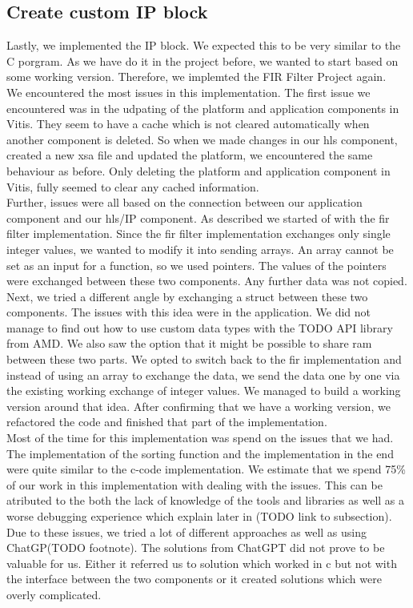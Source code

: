\documentclass[conference]{IEEEtran}
\begin{document}
\subsection{Create custom IP block}
Lastly, we implemented the IP block. We expected this to be very similar to the C porgram. As we have do it in the project before, we wanted to start based on some working version. Therefore, we implemted the FIR Filter Project again. \\
We encountered the most issues in this implementation. The first issue we encountered was in the udpating of the platform and application components in Vitis. They seem to have a cache which is not cleared automatically when another component is deleted. So when we made changes in our hls component, created a new xsa file and updated the platform, we encountered the same behaviour as before. Only deleting the platform and application component in Vitis, fully seemed to clear any cached information. \\
Further, issues were all based on the connection between our application component and our hls/IP component. As described we started of with the fir filter implementation. Since the fir filter implementation exchanges only single integer values, we wanted to modify it into sending arrays. An array cannot be set as an input for a function, so we used pointers. The values of the pointers were exchanged between these two components. Any further data was not copied. Next, we tried a different angle by exchanging a struct between these two components. The issues with this idea were in the application. We did not manage to find out how to use custom data types with the TODO API library from AMD. We also saw the option that it might be possible to share ram between these two parts. We opted to switch back to the fir implementation and instead of using an array to exchange the data, we send the data one by one via the existing working exchange of integer values. We managed to build a working version around that idea. After confirming that we have a working version, we refactored the code and finished that part of the implementation. \\
Most of the time for this implementation was spend on the issues that we had. The implementation of the sorting function and the implementation in the end were quite similar to the c-code implementation. We estimate that we spend 75\% of our work in this implementation with dealing with the issues. This can be atributed to the both the lack of knowledge of the tools and libraries as well as a worse debugging experience which explain later in (TODO link to subsection). Due to these issues, we tried a lot of different approaches as well as using ChatGP(TODO footnote). The solutions from ChatGPT did not prove to be valuable for us. Either it referred us to solution which worked in c but not with the interface between the two components or it created solutions which were overly complicated.
\end{document}
